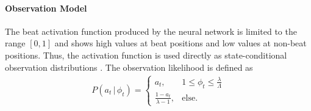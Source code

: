 \documentclass{scrartcl}
\begin{document}
\paragraph{Observation Model}
The beat activation function produced by the neural network is limited to the range $[0, 1]$ and shows high values at beat positions and low values at non-beat positions. Thus, the activation function is used directly as state-conditional observation distributions \cite{Degara2012}. The observation likelihood is defined as 
\begin{align}
P(a_t\,|\,\phi_t) = \begin{cases}
    a_t, &1 \leq \phi_t\leq \frac{\lambda}{\Lambda}\\
    \frac{1-a_t}{\lambda-1}, &\text{else}.    
\end{cases}
\end{align} 




\end{document}
